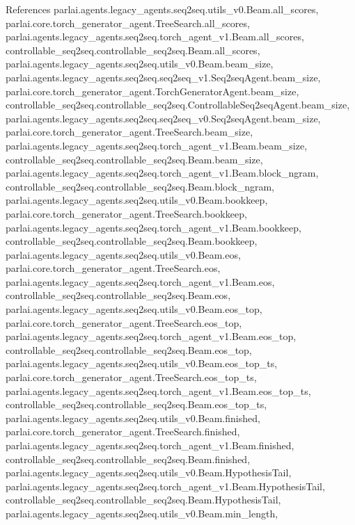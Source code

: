 References parlai.\+agents.\+legacy\+\_\+agents.\+seq2seq.\+utils\+\_\+v0.\+Beam.\+all\+\_\+scores, parlai.\+core.\+torch\+\_\+generator\+\_\+agent.\+Tree\+Search.\+all\+\_\+scores, parlai.\+agents.\+legacy\+\_\+agents.\+seq2seq.\+torch\+\_\+agent\+\_\+v1.\+Beam.\+all\+\_\+scores, controllable\+\_\+seq2seq.\+controllable\+\_\+seq2seq.\+Beam.\+all\+\_\+scores, parlai.\+agents.\+legacy\+\_\+agents.\+seq2seq.\+utils\+\_\+v0.\+Beam.\+beam\+\_\+size, parlai.\+agents.\+legacy\+\_\+agents.\+seq2seq.\+seq2seq\+\_\+v1.\+Seq2seq\+Agent.\+beam\+\_\+size, parlai.\+core.\+torch\+\_\+generator\+\_\+agent.\+Torch\+Generator\+Agent.\+beam\+\_\+size, controllable\+\_\+seq2seq.\+controllable\+\_\+seq2seq.\+Controllable\+Seq2seq\+Agent.\+beam\+\_\+size, parlai.\+agents.\+legacy\+\_\+agents.\+seq2seq.\+seq2seq\+\_\+v0.\+Seq2seq\+Agent.\+beam\+\_\+size, parlai.\+core.\+torch\+\_\+generator\+\_\+agent.\+Tree\+Search.\+beam\+\_\+size, parlai.\+agents.\+legacy\+\_\+agents.\+seq2seq.\+torch\+\_\+agent\+\_\+v1.\+Beam.\+beam\+\_\+size, controllable\+\_\+seq2seq.\+controllable\+\_\+seq2seq.\+Beam.\+beam\+\_\+size, parlai.\+agents.\+legacy\+\_\+agents.\+seq2seq.\+torch\+\_\+agent\+\_\+v1.\+Beam.\+block\+\_\+ngram, controllable\+\_\+seq2seq.\+controllable\+\_\+seq2seq.\+Beam.\+block\+\_\+ngram, parlai.\+agents.\+legacy\+\_\+agents.\+seq2seq.\+utils\+\_\+v0.\+Beam.\+bookkeep, parlai.\+core.\+torch\+\_\+generator\+\_\+agent.\+Tree\+Search.\+bookkeep, parlai.\+agents.\+legacy\+\_\+agents.\+seq2seq.\+torch\+\_\+agent\+\_\+v1.\+Beam.\+bookkeep, controllable\+\_\+seq2seq.\+controllable\+\_\+seq2seq.\+Beam.\+bookkeep, parlai.\+agents.\+legacy\+\_\+agents.\+seq2seq.\+utils\+\_\+v0.\+Beam.\+eos, parlai.\+core.\+torch\+\_\+generator\+\_\+agent.\+Tree\+Search.\+eos, parlai.\+agents.\+legacy\+\_\+agents.\+seq2seq.\+torch\+\_\+agent\+\_\+v1.\+Beam.\+eos, controllable\+\_\+seq2seq.\+controllable\+\_\+seq2seq.\+Beam.\+eos, parlai.\+agents.\+legacy\+\_\+agents.\+seq2seq.\+utils\+\_\+v0.\+Beam.\+eos\+\_\+top, parlai.\+core.\+torch\+\_\+generator\+\_\+agent.\+Tree\+Search.\+eos\+\_\+top, parlai.\+agents.\+legacy\+\_\+agents.\+seq2seq.\+torch\+\_\+agent\+\_\+v1.\+Beam.\+eos\+\_\+top, controllable\+\_\+seq2seq.\+controllable\+\_\+seq2seq.\+Beam.\+eos\+\_\+top, parlai.\+agents.\+legacy\+\_\+agents.\+seq2seq.\+utils\+\_\+v0.\+Beam.\+eos\+\_\+top\+\_\+ts, parlai.\+core.\+torch\+\_\+generator\+\_\+agent.\+Tree\+Search.\+eos\+\_\+top\+\_\+ts, parlai.\+agents.\+legacy\+\_\+agents.\+seq2seq.\+torch\+\_\+agent\+\_\+v1.\+Beam.\+eos\+\_\+top\+\_\+ts, controllable\+\_\+seq2seq.\+controllable\+\_\+seq2seq.\+Beam.\+eos\+\_\+top\+\_\+ts, parlai.\+agents.\+legacy\+\_\+agents.\+seq2seq.\+utils\+\_\+v0.\+Beam.\+finished, parlai.\+core.\+torch\+\_\+generator\+\_\+agent.\+Tree\+Search.\+finished, parlai.\+agents.\+legacy\+\_\+agents.\+seq2seq.\+torch\+\_\+agent\+\_\+v1.\+Beam.\+finished, controllable\+\_\+seq2seq.\+controllable\+\_\+seq2seq.\+Beam.\+finished, parlai.\+agents.\+legacy\+\_\+agents.\+seq2seq.\+utils\+\_\+v0.\+Beam.\+Hypothesis\+Tail, parlai.\+agents.\+legacy\+\_\+agents.\+seq2seq.\+torch\+\_\+agent\+\_\+v1.\+Beam.\+Hypothesis\+Tail, controllable\+\_\+seq2seq.\+controllable\+\_\+seq2seq.\+Beam.\+Hypothesis\+Tail, parlai.\+agents.\+legacy\+\_\+agents.\+seq2seq.\+utils\+\_\+v0.\+Beam.\+min\+\_\+length, 